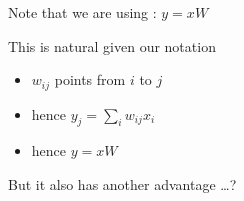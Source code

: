 \begin{frame}
    
    Note that we are using :  $y = x W$

        \vspace{0.5em}
        \vspace{0.5em}
    This is natural given our notation 

    \begin{itemize}
        \item $w_{ij}$ points from $i$ to $j$
        \vspace{0.5em}
        \item hence $y_j = \sum_i w_{ij} x_i$
        \vspace{0.5em}
        \item hence $y = x W$
    \end{itemize}

        \vspace{0.5em}
    But it also has another advantage \ldots?


\end{frame}


